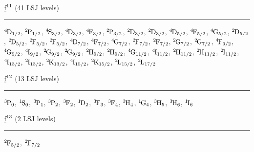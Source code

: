 \begin{mdframed}
\begin{center}
$\forb^{11}$
(41 LSJ levels)
\vspace{0.25cm}
\hrule
\vspace{0.25cm}

$\LSJterm{4}{D}{1/2}$, $\LSJterm{2}{P}{1/2}$, $\LSJterm{4}{S}{3/2}$, $\LSJterm{4}{D}{3/2}$, $\LSJterm{4}{F}{3/2}$, $\LSJterm{2}{P}{3/2}$, $\LSJterm{2}{D}{3/2}$, $\LSJterm{2}{D}{3/2}$, $\LSJterm{4}{D}{5/2}$, $\LSJterm{4}{F}{5/2}$, $\LSJterm{4}{G}{5/2}$, $\LSJterm{2}{D}{5/2}$, $\LSJterm{2}{D}{5/2}$, $\LSJterm{2}{F}{5/2}$, $\LSJterm{2}{F}{5/2}$, $\LSJterm{4}{D}{7/2}$, $\LSJterm{4}{F}{7/2}$, $\LSJterm{4}{G}{7/2}$, $\LSJterm{2}{F}{7/2}$, $\LSJterm{2}{F}{7/2}$, $\LSJterm{2}{G}{7/2}$, $\LSJterm{2}{G}{7/2}$, $\LSJterm{4}{F}{9/2}$, $\LSJterm{4}{G}{9/2}$, $\LSJterm{4}{I}{9/2}$, $\LSJterm{2}{G}{9/2}$, $\LSJterm{2}{G}{9/2}$, $\LSJterm{2}{H}{9/2}$, $\LSJterm{2}{H}{9/2}$, $\LSJterm{4}{G}{11/2}$, $\LSJterm{4}{I}{11/2}$, $\LSJterm{2}{H}{11/2}$, $\LSJterm{2}{H}{11/2}$, $\LSJterm{2}{I}{11/2}$, $\LSJterm{4}{I}{13/2}$, $\LSJterm{2}{I}{13/2}$, $\LSJterm{2}{K}{13/2}$, $\LSJterm{4}{I}{15/2}$, $\LSJterm{2}{K}{15/2}$, $\LSJterm{2}{L}{15/2}$, $\LSJterm{2}{L}{17/2}$
\end{center}
\end{mdframed}


\begin{mdframed}
\begin{center}
$\forb^{12}$
(13 LSJ levels)
\vspace{0.25cm}
\hrule
\vspace{0.25cm}

$\LSJterm{3}{P}{0}$, $\LSJterm{1}{S}{0}$, $\LSJterm{3}{P}{1}$, $\LSJterm{3}{P}{2}$, $\LSJterm{3}{F}{2}$, $\LSJterm{1}{D}{2}$, $\LSJterm{3}{F}{3}$, $\LSJterm{3}{F}{4}$, $\LSJterm{3}{H}{4}$, $\LSJterm{1}{G}{4}$, $\LSJterm{3}{H}{5}$, $\LSJterm{3}{H}{6}$, $\LSJterm{1}{I}{6}$
\end{center}
\end{mdframed}


\begin{mdframed}
\begin{center}
$\forb^{13}$
(2 LSJ levels)
\vspace{0.25cm}
\hrule
\vspace{0.25cm}

$\LSJterm{2}{F}{5/2}$, $\LSJterm{2}{F}{7/2}$
\end{center}
\end{mdframed}
